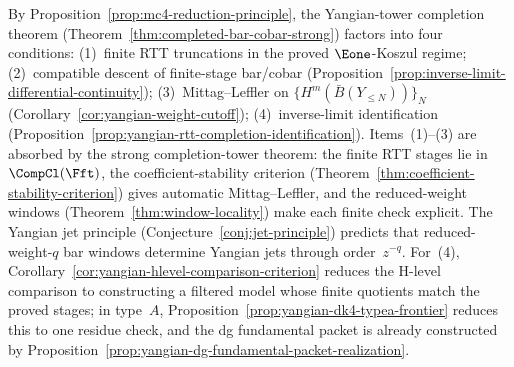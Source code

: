 \begin{remark}
\label{rem:yangian-mc4-conditions}
By Proposition~\ref{prop:mc4-reduction-principle}, the Yangian-tower
completion theorem (Theorem~\ref{thm:completed-bar-cobar-strong})
factors into four conditions:
\textup{(1)}~finite RTT truncations in the proved $\Eone$-Koszul regime;
\textup{(2)}~compatible descent of finite-stage bar/cobar
(Proposition~\ref{prop:inverse-limit-differential-continuity});
\textup{(3)}~Mittag--Leffler on
$\{H^m(\bar B(Y_{\le N}))\}_N$
(Corollary~\ref{cor:yangian-weight-cutoff});
\textup{(4)}~inverse-limit identification
(Proposition~\ref{prop:yangian-rtt-completion-identification}).
Items~\textup{(1)}--\textup{(3)} are absorbed by the strong
completion-tower theorem: the finite RTT stages lie in
$\CompCl(\Fft)$, the coefficient-stability criterion
(Theorem~\ref{thm:coefficient-stability-criterion}) gives automatic
Mittag--Leffler, and the reduced-weight windows
(Theorem~\ref{thm:window-locality}) make each finite check
explicit. The Yangian jet principle
\ifannalsedition\else
(Conjecture~\ref{conj:jet-principle})
\fi predicts that reduced-weight-$q$
bar windows determine Yangian jets through order~$z^{-q}$.
For~\textup{(4)},
Corollary~\ref{cor:yangian-hlevel-comparison-criterion} reduces the
H-level comparison to constructing a filtered model whose finite
quotients match the proved stages; in type~$A$,
Proposition~\ref{prop:yangian-dk4-typea-frontier} reduces this to one
residue check, and the dg fundamental packet is already constructed by
Proposition~\ref{prop:yangian-dg-fundamental-packet-realization}.
\end{remark}


